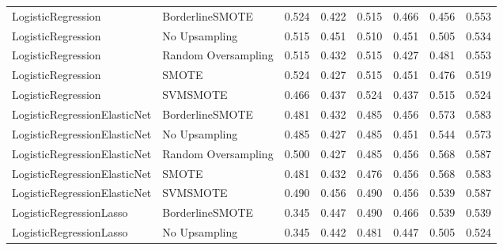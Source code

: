 \begin{tabular}{llllllll}
          LogisticRegression &     BorderlineSMOTE & 0.524 &                     0.422 &                 0.515 &                  0.466 &                                   0.456 &     0.553 \\
          LogisticRegression &       No Upsampling & 0.515 &                     0.451 &                 0.510 &                  0.451 &                                   0.505 &     0.534 \\
          LogisticRegression & Random Oversampling & 0.515 &                     0.432 &                 0.515 &                  0.427 &                                   0.481 &     0.553 \\
          LogisticRegression &               SMOTE & 0.524 &                     0.427 &                 0.515 &                  0.451 &                                   0.476 &     0.519 \\
          LogisticRegression &            SVMSMOTE & 0.466 &                     0.437 &                 0.524 &                  0.437 &                                   0.515 &     0.524 \\
LogisticRegressionElasticNet &     BorderlineSMOTE & 0.481 &                     0.432 &                 0.485 &                  0.456 &                                   0.573 &     0.583 \\
LogisticRegressionElasticNet &       No Upsampling & 0.485 &                     0.427 &                 0.485 &                  0.451 &                                   0.544 &     0.573 \\
LogisticRegressionElasticNet & Random Oversampling & 0.500 &                     0.427 &                 0.485 &                  0.456 &                                   0.568 &     0.587 \\
LogisticRegressionElasticNet &               SMOTE & 0.481 &                     0.432 &                 0.476 &                  0.456 &                                   0.568 &     0.583 \\
LogisticRegressionElasticNet &            SVMSMOTE & 0.490 &                     0.456 &                 0.490 &                  0.456 &                                   0.539 &     0.587 \\
     LogisticRegressionLasso &     BorderlineSMOTE & 0.345 &                     0.447 &                 0.490 &                  0.466 &                                   0.539 &     0.539 \\
     LogisticRegressionLasso &       No Upsampling & 0.345 &                     0.442 &                 0.481 &                  0.447 &                                   0.505 &     0.524 \\

\end{tabular}
